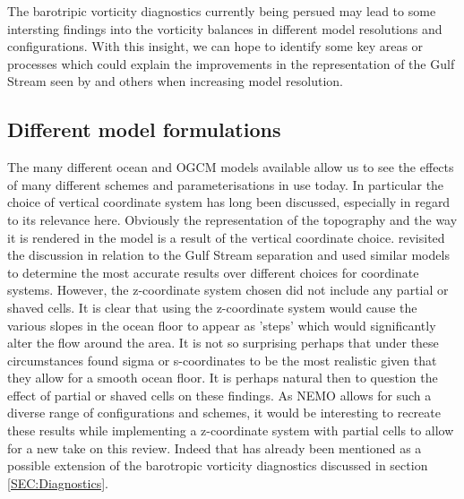 \documentclass[..\EOYR.tex]{subfiles}
\begin{document}
The barotripic vorticity diagnostics currently being persued may lead to some intersting findings into the vorticity balances in different model resolutions and configurations. With this insight, we can hope to identify some key areas or processes which could explain the improvements in the representation of the Gulf Stream seen by \citep{Scaife2011a} and others when increasing model resolution.


\subsection{Different model formulations}
\label{SSEC:DifferentModelFormulations}

The many different ocean and OGCM models available allow us to see the effects of many different schemes and parameterisations in use today. In particular the choice of vertical coordinate system has long been discussed, especially in regard to its relevance here. Obviously the representation of the topography and the way it is rendered in the model is a result of the vertical coordinate choice. \citep{Ezer2016b} revisited the discussion in relation to the Gulf Stream separation and used similar models to determine the most accurate results over different choices for coordinate systems. However, the z-coordinate system chosen did not include any partial or shaved cells.
It is clear that using the z-coordinate system would cause the various slopes in the ocean floor to appear as 'steps' which would significantly alter the flow around the area. It is not so surprising perhaps that under these circumstances \citep{Ezer2016b} found sigma or s-coordinates to be the most realistic given that they allow for a smooth ocean floor. It is perhaps natural then to question the effect of partial or shaved cells on these findings. As NEMO allows for such a diverse range of configurations and schemes, it would be interesting to recreate these results while implementing a z-coordinate system with partial cells to allow for a new take on this review. Indeed that has already been mentioned as a possible extension of the barotropic vorticity diagnostics discussed in section \ref{SEC:Diagnostics}.\\
\end{document}
